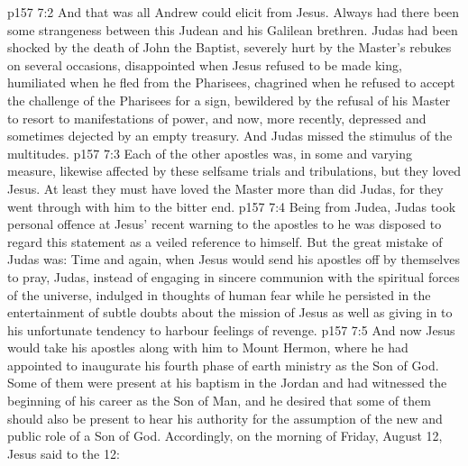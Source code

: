 \vs p157 7:2 And that was all Andrew could elicit from Jesus. Always had there been some strangeness between this Judean and his Galilean brethren. Judas had been shocked by the death of John the Baptist, severely hurt by the Master’s rebukes on several occasions, disappointed when Jesus refused to be made king, humiliated when he fled from the Pharisees, chagrined when he refused to accept the challenge of the Pharisees for a sign, bewildered by the refusal of his Master to resort to manifestations of power, and now, more recently, depressed and sometimes dejected by an empty treasury. And Judas missed the stimulus of the multitudes.
\vs p157 7:3 Each of the other apostles was, in some and varying measure, likewise affected by these selfsame trials and tribulations, but they loved Jesus. At least they must have loved the Master more than did Judas, for they went through with him to the bitter end.
\vs p157 7:4 Being from Judea, Judas took personal offence at Jesus’ recent warning to the apostles to  he was disposed to regard this statement as a veiled reference to himself. But the great mistake of Judas was: Time and again, when Jesus would send his apostles off by themselves to pray, Judas, instead of engaging in sincere communion with the spiritual forces of the universe, indulged in thoughts of human fear while he persisted in the entertainment of subtle doubts about the mission of Jesus as well as giving in to his unfortunate tendency to harbour feelings of revenge.
\vs p157 7:5 \pc And now Jesus would take his apostles along with him to Mount Hermon, where he had appointed to inaugurate his fourth phase of earth ministry as the Son of God. Some of them were present at his baptism in the Jordan and had witnessed the beginning of his career as the Son of Man, and he desired that some of them should also be present to hear his authority for the assumption of the new and public role of a Son of God. Accordingly, on the morning of Friday, August 12, Jesus said to the 12: 
